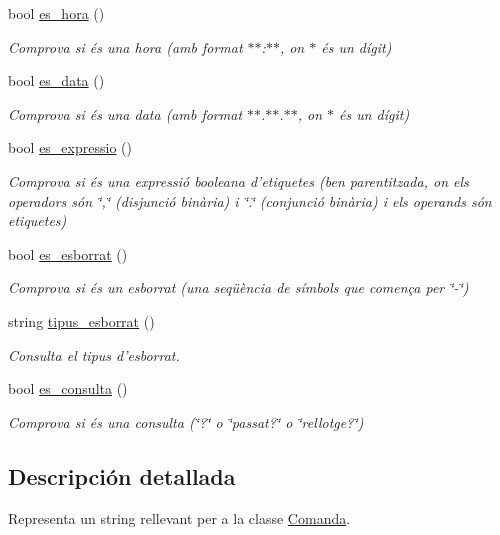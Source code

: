 \begin{DoxyCompactItemize}
bool \hyperlink{class_token_a16aead065c986f34b51c6193bd42882c}{es\-\_\-hora} ()
\begin{DoxyCompactList}\small\item\em Comprova si és una hora (amb format $\ast$$\ast$\-:$\ast$$\ast$, on $\ast$ és un dígit) \end{DoxyCompactList}\item 
bool \hyperlink{class_token_a8791d9d6123190213f63ad1026ca05be}{es\-\_\-data} ()
\begin{DoxyCompactList}\small\item\em Comprova si és una data (amb format $\ast$$\ast$.$\ast$$\ast$.$\ast$$\ast$, on $\ast$ és un dígit) \end{DoxyCompactList}\item 
bool \hyperlink{class_token_a09eb1782d5b5d9d4a2a92f33c950bfc1}{es\-\_\-expressio} ()
\begin{DoxyCompactList}\small\item\em Comprova si és una expressió booleana d'etiquetes (ben parentitzada, on els operadors són \char`\"{},\char`\"{} (disjunció binària) i \char`\"{}.\char`\"{} (conjunció binària) i els operands són etiquetes) \end{DoxyCompactList}\item 
bool \hyperlink{class_token_ab49eee0e53697bbbbbcbf0c105b3cf77}{es\-\_\-esborrat} ()
\begin{DoxyCompactList}\small\item\em Comprova si és un esborrat (una seqüència de símbols que comença per \char`\"{}-\/\char`\"{}) \end{DoxyCompactList}\item 
string \hyperlink{class_token_a12c961c772aa760b719dc3becb523ac4}{tipus\-\_\-esborrat} ()
\begin{DoxyCompactList}\small\item\em Consulta el tipus d'esborrat. \end{DoxyCompactList}\item 
bool \hyperlink{class_token_a81c4eba71c6257da6cadfab43cb237da}{es\-\_\-consulta} ()
\begin{DoxyCompactList}\small\item\em Comprova si és una consulta (\char`\"{}?\char`\"{} o \char`\"{}passat?\char`\"{} o \char`\"{}rellotge?\char`\"{}) \end{DoxyCompactList}\end{DoxyCompactItemize}


\subsection{Descripción detallada}
Representa un string rellevant per a la classe \hyperlink{class_comanda}{Comanda}. 

